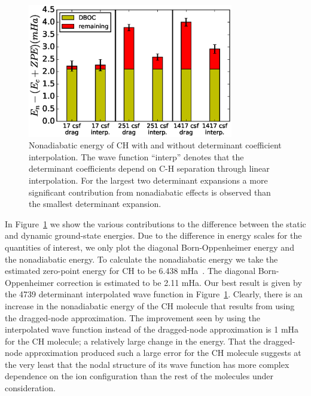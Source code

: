 \begin{figure}[h]
\includegraphics[width=0.8\textwidth]{ch-only}
\caption{Nonadiabatic energy of CH with and without determinant coefficient interpolation.  The wave function ``interp'' denotes that the determinant coefficients depend on C-H separation through linear interpolation. For the largest two determinant expansions a more significant contribution from nonadiabatic effects is observed than the smallest determinant expansion. \label{fig:ch-interp} }
\end{figure}

In Figure~\ref{fig:ch-interp} we show the various contributions to the difference between
the static and dynamic ground-state energies. Due to the difference in energy
scales for the quantities of interest, we only plot the diagonal Born-Oppenheimer
energy and the nonadiabatic energy. To calculate the nonadiabatic energy we
take the estimated zero-point energy for CH to be 6.438 mHa~\cite{Feller_Corrections}. The diagonal
Born-Oppenheimer correction is estimated to be 2.11 mHa. Our best result is
given by the 4739 determinant interpolated wave function in Figure~\ref{fig:ch-interp}. Clearly,
there is an increase in the nonadiabatic energy of the CH molecule that results
from using the dragged-node approximation. The improvement seen by using the
interpolated wave function instead of the dragged-node approximation is 1 mHa
for the CH molecule; a relatively large change in the energy.
That the dragged-node approximation produced such a large error
for the CH molecule suggests at the very least that the nodal structure of its wave
function has more complex dependence on the ion configuration than the rest of
the molecules under consideration.

